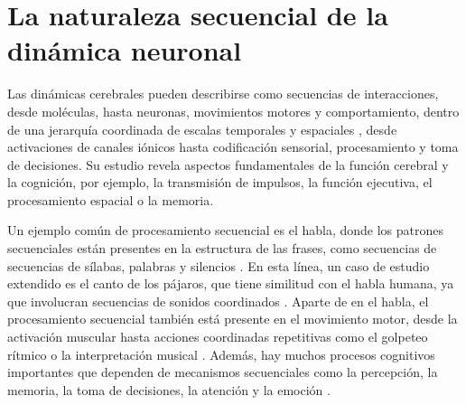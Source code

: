 \section{La naturaleza secuencial de la dinámica neuronal}

Las dinámicas cerebrales pueden describirse como secuencias de interacciones, desde moléculas, hasta neuronas, movimientos motores y comportamiento, dentro de una jerarquía coordinada de escalas temporales y espaciales \parencite{kiebel_hierarchy_2008,yuste05,rabinovich_discrete_2018,Rabinovich23}, desde activaciones de canales iónicos hasta codificación sensorial, procesamiento y toma de decisiones. Su estudio revela aspectos fundamentales de la función cerebral y la cognición, por ejemplo, la transmisión de impulsos, la función ejecutiva, el procesamiento espacial o la memoria.

Un ejemplo común de procesamiento secuencial es el habla, donde los patrones secuenciales están presentes en la estructura de las frases, como secuencias de secuencias de sílabas, palabras y silencios \parencite{kiebel_recognizing_2009}. En esta línea, un caso de estudio extendido es el canto de los pájaros, que tiene similitud con el habla humana, ya que involucran secuencias de sonidos coordinados \parencite{prather_brains_2017,fishbein_sound_2019}. Aparte de en el habla, el procesamiento secuencial también está presente en el movimiento motor, desde la activación muscular hasta acciones coordinadas repetitivas como el golpeteo rítmico o la interpretación musical \parencite{ding_temporal_2017}. Además, hay muchos procesos cognitivos importantes que dependen de mecanismos secuenciales como la percepción, la memoria, la toma de decisiones, la atención y la emoción \parencite{Varona2016, he_robust_2018, rabinovich_sequential_2020}.

